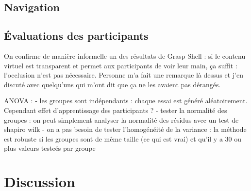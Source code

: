 




\subsection{Navigation}




\subsection{Évaluations des participants}




On confirme de manière informelle un des résultats de Grasp Shell : si le contenu virtuel est transparent et permet aux participants de voir leur main, ça suffit : l'occlusion n'est pas nécessaire. Personne m'a fait une remarque là dessus et j'en discuté avec quelqu'uns qui m'ont dit que ça ne les avaient pas dérangés.

ANOVA :
- les groupes sont indépendants : chaque essai est généré aléatoirement. Cependant effet d'apprentissage des participants ?
- tester la normalité des groupes : on peut simplement analyser la normalité des résidus avec un test de shapiro wilk
- on a pas besoin de tester l'homogénéité de la variance : la méthode est robuste si les groupes sont de même taille (ce qui est vrai) et qu'il y a 30 ou plus valeurs testeés par groupe


\section{Discussion}
